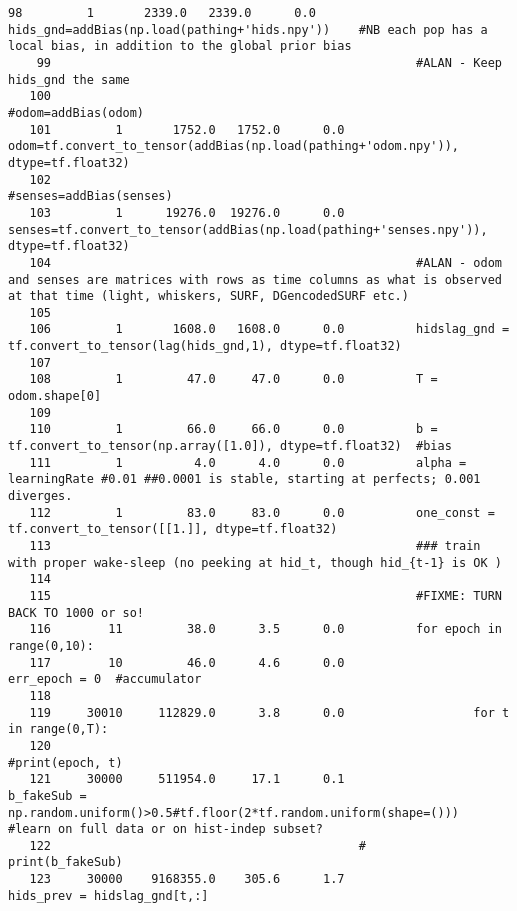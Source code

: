 \begin{lstlisting}[xrightmargin=0.05\linewidth,caption=Line by line profiling of the learnWeights\#learn function (boltzmann probs as an eager function), label=profiling:line_learn]
    98         1       2339.0   2339.0      0.0          hids_gnd=addBias(np.load(pathing+'hids.npy'))    #NB each pop has a local bias, in addition to the global prior bias
    99                                                   #ALAN - Keep hids_gnd the same 
   100                                                   #odom=addBias(odom)
   101         1       1752.0   1752.0      0.0          odom=tf.convert_to_tensor(addBias(np.load(pathing+'odom.npy')), dtype=tf.float32)
   102                                                   #senses=addBias(senses)
   103         1      19276.0  19276.0      0.0          senses=tf.convert_to_tensor(addBias(np.load(pathing+'senses.npy')), dtype=tf.float32)
   104                                                   #ALAN - odom and senses are matrices with rows as time columns as what is observed at that time (light, whiskers, SURF, DGencodedSURF etc.)
   105                                           
   106         1       1608.0   1608.0      0.0          hidslag_gnd = tf.convert_to_tensor(lag(hids_gnd,1), dtype=tf.float32)
   107                                           
   108         1         47.0     47.0      0.0          T = odom.shape[0]
   109                                           
   110         1         66.0     66.0      0.0          b = tf.convert_to_tensor(np.array([1.0]), dtype=tf.float32)  #bias
   111         1          4.0      4.0      0.0          alpha = learningRate #0.01 ##0.0001 is stable, starting at perfects; 0.001 diverges.
   112         1         83.0     83.0      0.0          one_const = tf.convert_to_tensor([[1.]], dtype=tf.float32)
   113                                                   ### train with proper wake-sleep (no peeking at hid_t, though hid_{t-1} is OK )
   114                                                   
   115                                                   #FIXME: TURN BACK TO 1000 or so!
   116        11         38.0      3.5      0.0          for epoch in range(0,10):
   117        10         46.0      4.6      0.0                  err_epoch = 0  #accumulator
   118                                           
   119     30010     112829.0      3.8      0.0                  for t in range(0,T):
   120                                                               #print(epoch, t)
   121     30000     511954.0     17.1      0.1                      b_fakeSub = np.random.uniform()>0.5#tf.floor(2*tf.random.uniform(shape=()))  #learn on full data or on hist-indep subset?
   122                                           #                    print(b_fakeSub)
   123     30000    9168355.0    305.6      1.7                      hids_prev = hidslag_gnd[t,:]

\end{lstlisting}
